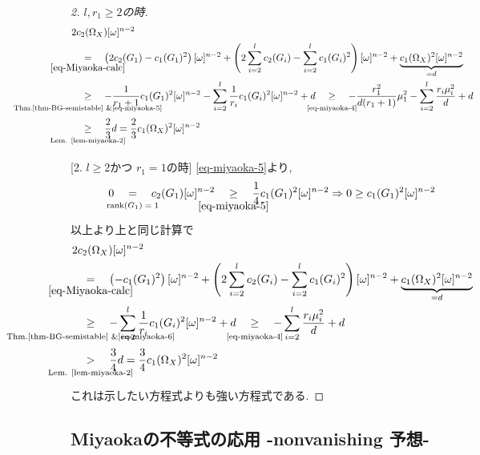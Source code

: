 \documentclass[dvipdfmx,a4paper,11pt]{article} %
\theoremstyle{definition}
\theoremstyle{remark}
\numberwithin{equation}{section}
\renewcommand{\rank}[0]{\operatorname{rank}}
\newcommand{\underalign}[2]{\quad \underset{\mathclap{\strut #1}}{#2}\quad}
\begin{document}
\begin{proof}
[2. $l,  r_1\ge 2$の時]
\[
\begin{aligned}
&2c_2(\Omega_X)[\omega]^{n-2}
\\
&\underalign{\eqref{eq-Miyaoka-calc}}{=}
\left(
2 c_2(G_1)
-
c_1(G_1)^2
\right)[\omega]^{n-2}
+
\left(
2\sum_{i=2}^{l}c_2(G_i)
-
\sum_{i=2}^{l}c_1(G_i)^2
\right)[\omega]^{n-2}
+
\underbrace{c_1(\Omega_X)^2[\omega]^{n-2}}_{=d}
\\
&\underalign{\text{Thm.\ref{thm-BG-semistable} \&\eqref{eq-miyaoka-5}}}{\ge}
-\frac{1}{r_1+1}c_1(G_1)^2[\omega]^{n-2}
-
\sum_{i=2}^{l}\frac{1}{r_i}c_1(G_i)^2
[\omega]^{n-2}
+
d 
\underalign{\text{\eqref{eq-miyaoka-4}}}{\ge}
-\frac{r_1^2}{d(r_1+1)}\mu_1^2
-
\sum_{i=2}^{l}\frac{r_i \mu_i^2}{d}
+
d 
\\
&\underalign{\text{Lem. \eqref{lem-miyaoka-2}}}{\ge}
\frac{2}{3}d
=\frac{2}{3}c_1(\Omega_X)^2[\omega]^{n-2}
\end{aligned}
\]


[2. $l \ge2$かつ $r_1=1$の時]
\eqref{eq-miyaoka-5}より, 
\begin{equation}
\label{eq-miyaoka-6}
0
\underalign{\text{$\rank(G_1)=1$}}{=}
c_2(G_1) [\omega]^{n-2}
\underalign{\eqref{eq-miyaoka-5}}{\ge}
\frac{1}{4}c_1(G_1)^2 [\omega]^{n-2}
\Rightarrow
0 \ge c_1(G_1)^2 [\omega]^{n-2} 
\end{equation}
以上より上と同じ計算で
\[
\begin{aligned}
&2c_2(\Omega_X)[\omega]^{n-2}
\\
&\underalign{\eqref{eq-Miyaoka-calc}}{=}
\left(
-
c_1(G_1)^2
\right)[\omega]^{n-2}
+
\left(
2\sum_{i=2}^{l}c_2(G_i)
-
\sum_{i=2}^{l}c_1(G_i)^2
\right)[\omega]^{n-2}
+
\underbrace{c_1(\Omega_X)^2[\omega]^{n-2}}_{=d}
\\
&\underalign{\text{Thm.\ref{thm-BG-semistable} \&\eqref{eq-miyaoka-6}}}{\ge}
-
\sum_{i=2}^{l}\frac{1}{r_i}c_1(G_i)^2
[\omega]^{n-2}
+
d 
\underalign{\text{\eqref{eq-miyaoka-4}}}{\ge}
-
\sum_{i=2}^{l}\frac{r_i \mu_i^2}{d}
+
d 
\\
&\underalign{\text{Lem. \eqref{lem-miyaoka-2}}}{>}
\frac{3}{4}d
=\frac{3}{4}c_1(\Omega_X)^2[\omega]^{n-2}
\end{aligned}
\]
これは示したい方程式よりも強い方程式である. 
\end{proof}

\subsection{Miyaokaの不等式の応用 -nonvanishing 予想-}
\end{document}
